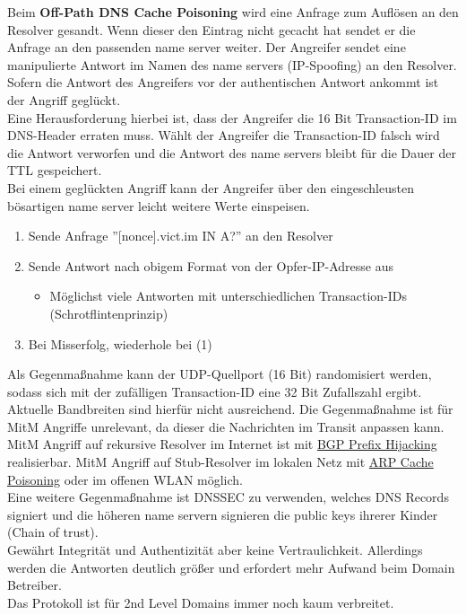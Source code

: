 \documentclass[a4paper,12pt,leqno]{article}
\begin{document}
Beim \textbf{Off-Path DNS Cache Poisoning} wird eine Anfrage zum Auflösen an den Resolver gesandt. Wenn dieser den Eintrag nicht gecacht hat sendet er die Anfrage an den passenden name server weiter. Der Angreifer sendet eine manipulierte Antwort im Namen des name servers (IP-Spoofing) an den Resolver. Sofern die Antwort des Angreifers vor der authentischen Antwort ankommt ist der Angriff geglückt.\\
Eine Herausforderung hierbei ist, dass der Angreifer die 16 Bit Transaction-ID im DNS-Header erraten muss. Wählt der Angreifer die Transaction-ID falsch wird die Antwort verworfen und die Antwort des name servers bleibt für die Dauer der TTL gespeichert.\\
Bei einem geglückten Angriff kann der Angreifer über den eingeschleusten bösartigen name server leicht weitere Werte einspeisen.\\
\begin{enumerate}
\item Sende Anfrage ''[nonce].vict.im IN A?'' an den Resolver
\item Sende Antwort nach obigem Format von der Opfer-IP-Adresse aus
	\begin{itemize}
	\item Möglichst viele Antworten mit unterschiedlichen Transaction-IDs (Schrotflintenprinzip)
	\end{itemize}
\item Bei Misserfolg, wiederhole bei (1)
\end{enumerate}
Als Gegenmaßnahme kann der UDP-Quellport (16 Bit) randomisiert werden, sodass sich mit der zufälligen Transaction-ID eine 32 Bit Zufallszahl ergibt. Aktuelle Bandbreiten sind hierfür nicht ausreichend. Die Gegenmaßnahme ist für MitM Angriffe unrelevant, da dieser die Nachrichten im Transit anpassen kann.\\

MitM Angriff auf rekursive Resolver im Internet ist mit \hyperref[txt:BGP-PrefixHijacking]{BGP Prefix Hijacking} realisierbar. MitM Angriff auf Stub-Resolver im lokalen Netz mit \hyperref[txt:spoofing]{ARP Cache Poisoning} oder im offenen WLAN möglich.\\

Eine weitere Gegenmaßnahme ist DNSSEC zu verwenden, welches DNS Records signiert und die höheren name servern signieren die public keys ihrerer Kinder (Chain of trust).\\
Gewährt Integrität und Authentizität aber keine Vertraulichkeit. 
Allerdings werden die Antworten deutlich größer und erfordert mehr Aufwand beim Domain Betreiber.\\
Das Protokoll ist für 2nd Level Domains immer noch kaum verbreitet.\\
\end{document}
